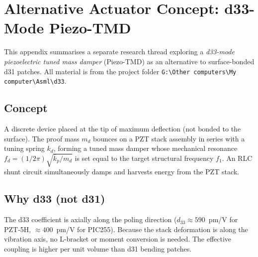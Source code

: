 \documentclass[12pt,a4paper]{article}
\begin{document}
\section{Alternative Actuator Concept: d33-Mode Piezo-TMD}
\label{app:d33}

This appendix summarises a separate research thread exploring a
\emph{d33-mode piezoelectric tuned mass damper} (Piezo-TMD) as an alternative
to surface-bonded d31 patches.  All material is from the project folder
\texttt{G:\textbackslash{}Other computers\textbackslash{}My computer\textbackslash{}Asml\textbackslash{}d33}.

\subsection*{Concept}

A discrete device placed at the tip of maximum deflection (not bonded to the
surface).  The proof mass $m_d$ bounces on a PZT stack assembly in series with a
tuning spring $k_d$, forming a tuned mass damper whose mechanical resonance
$f_d = (1/2\pi)\sqrt{\bar{k}_p / m_d}$ is set equal to the target structural
frequency $f_1$.  An RLC shunt circuit simultaneously damps and harvests energy
from the PZT stack.

\subsection*{Why d33 (not d31)}

The d33 coefficient is axially along the poling direction
($d_{33} \approx 590$~pm/V for PZT-5H, $\approx 400$~pm/V for PIC255).
Because the stack deformation is along the vibration axis, no L-bracket or
moment conversion is needed.  The effective coupling is higher per unit volume
than d31 bending patches.
\end{document}
